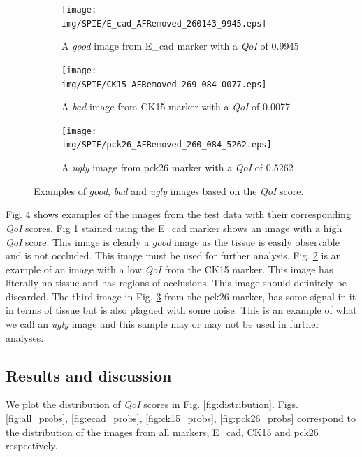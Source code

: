 \begin{figure} [ht!]
    \centering
    \begin{subfigure}[b]{0.3\textwidth}
        \centering
        \texttt{[image: img/SPIE/E\_cad\_AFRemoved\_260143\_9945.eps]}
        \caption{A \textit{good} image from E\_cad marker with a \textit{QoI} of 0.9945}
        \label{fig:good}
    \end{subfigure}
    \hfill
    \begin{subfigure}[b]{0.3\textwidth}
        \centering
        \texttt{[image: img/SPIE/CK15\_AFRemoved\_269\_084\_0077.eps]}
        \caption{A \textit{bad} image from CK15 marker with a \textit{QoI} of 0.0077}
        \label{fig:bad}
    \end{subfigure}
    \hfill
    \begin{subfigure}[b]{0.3\textwidth}
        \centering
        \texttt{[image: img/SPIE/pck26\_AFRemoved\_260\_084\_5262.eps]}
        \caption{A \textit{ugly} image from pck26 marker with a \textit{QoI} of 0.5262}
        \label{fig:ugly}
    \end{subfigure}
    \caption{Examples of \textit{good}, \textit{bad} and \textit{ugly} images based on the \textit{QoI} score.}
    \label{fig:gbu}
\end{figure}

Fig. \ref{fig:gbu} shows examples of the images from the test data with their corresponding \textit{QoI} scores. Fig \ref{fig:good} stained using the E\_cad marker shows an image with a high \textit{QoI} score. This image is clearly a \textit{good} image as the tissue is easily observable and is not occluded. This image must be used for further analysis. Fig. \ref{fig:bad} is an example of an image with a low \textit{QoI} from the CK15 marker. This image has literally no tissue and has regions of occlusions. This image should definitely be discarded. The third image in Fig. \ref{fig:ugly} from the pck26 marker, has some signal in it in terms of tissue but is also plagued with some noise. This is an example of what we call an \textit{ugly} image and this sample may or may not be used in further analyses.

\subsection{Results and discussion}
We plot the distribution of \textit{QoI} scores in Fig. \ref{fig:distribution}. Figs. \ref{fig:all_probs}, \ref{fig:ecad_probs}, \ref{fig:ck15_probs}, \ref{fig:pck26_probs} correspond to the distribution of the images from all markers, E\_cad, CK15 and pck26 respectively. 

